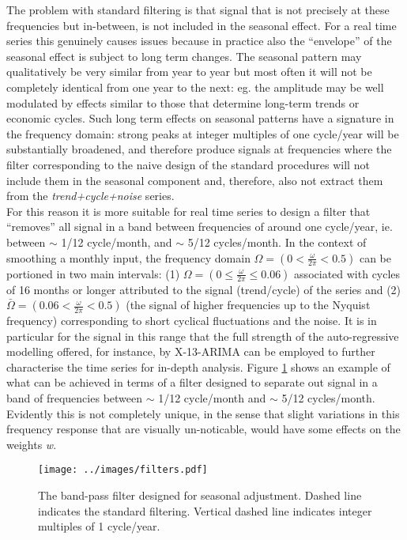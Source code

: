 \documentclass{article}
\begin{document}
The problem with standard filtering is that signal that is not precisely at these frequencies but in-between, is not included in the seasonal effect. For a real time series this genuinely causes issues because in practice also the ``envelope'' of the seasonal effect is subject to long term changes. The seasonal pattern may qualitatively be very similar from year to year but most often it will not be completely identical from one year to the next: eg. the amplitude may be well modulated by effects similar to those that determine long-term trends or economic cycles. Such long term effects on seasonal patterns have a signature in the frequency domain: strong peaks at integer multiples of one cycle/year will be substantially broadened, and therefore produce signals at frequencies where the filter corresponding to the naive design of the standard procedures will not include them in the seasonal component and, therefore, also not extract them from the \textit{trend+cycle+noise} series.\\For this reason it is more suitable for real time series to design a filter that ``removes'' all signal in a band between frequencies of around one cycle/year, ie. between $\sim$ 1/12 cycle/month, and $\sim$ 5/12 cycles/month. In the context of smoothing a monthly input, the frequency domain $\Omega=(0<\frac {\omega}{2\pi}<0.5)$ can be portioned in two main intervals: (1) $\Omega=(0 \leq \frac {\omega}{2\pi} \leq 0.06)$ associated with cycles of 16 months or longer attributed to the signal (trend/cycle) of the series and (2) $\bar{\Omega}=(0.06 < \frac {\omega}{2\pi} < 0.5)$ (the signal of higher frequencies up to the Nyquist frequency) corresponding to short cyclical fluctuations and the noise. It is in particular for the signal in this range that the full strength of the auto-regressive modelling offered, for instance, by X-13-ARIMA can be employed to further characterise the time series for in-depth analysis. Figure \ref{fig:filters} shows an example of what can be achieved in terms of a filter designed to separate out signal in a band of frequencies between $\sim$ 1/12 cycle/month and $\sim$ 5/12 cycles/month. Evidently this is not completely unique, in the sense that slight variations in this frequency response that are visually un-noticable, would have some effects on the weights \textit{w}. 
\begin{figure}[h]
 \texttt{[image: ../images/filters.pdf]}
 \caption{The band-pass filter designed for seasonal adjustment. Dashed line indicates the standard filtering. Vertical dashed line indicates integer multiples of 1 cycle/year.}
 \label{fig:filters}
\end{figure}
\end{document}
